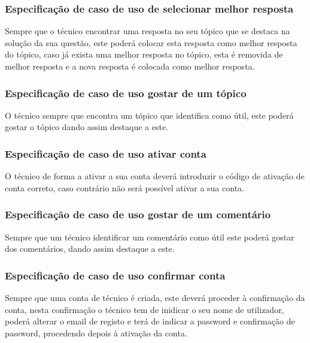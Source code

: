 

\newpage

\subsubsection{Especificação de caso de uso de selecionar melhor resposta}

Sempre que o técnico encontrar uma resposta no seu tópico que se destaca na solução da sua questão, 
este poderá colocar esta resposta como melhor resposta do tópico, caso já exista uma melhor resposta no 
tópico, esta é removida de melhor resposta e a nova resposta é colocada como melhor resposta.



\newpage

\subsubsection{Especificação de caso de uso gostar de um tópico}

O técnico sempre que encontra um tópico que identifica como útil, este poderá gostar o tópico dando assim 
destaque a este.





\subsubsection{Especificação de caso de uso ativar conta}

O técnico de forma a ativar a sua conta deverá introduzir o código de ativação de conta correto, 
caso contrário não será possível ativar a sua conta.



\subsubsection{Especificação de caso de uso gostar de um comentário}

Sempre que um técnico identificar um comentário como útil este poderá gostar dos comentários, dando 
assim destaque a este.



\newpage

\subsubsection{Especificação de caso de uso confirmar conta}

Sempre que uma conta de técnico é criada, este deverá proceder à confirmação da conta, nesta confirmação
o técnico tem de inidicar o seu nome de utilizador, poderá alterar o email de registo e terá de indicar a
password e confirmação de password, procedendo depois à ativação da conta.


